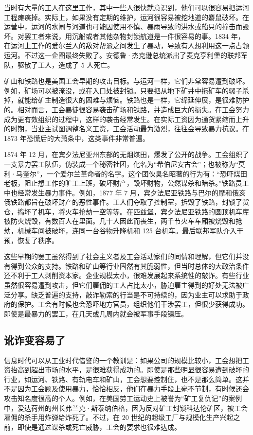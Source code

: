 当时有大量的工人在这里工作，其中一些人很快就意识到，他们可以很容易把运河工程瘫痪掉。实际上，如果没有定期的维护，运河很容易被挖地道的麝鼠破坏。在运营中，运河的水闸与河道也可能因使用不慎、暴雨导致的洪水或船只的撞击而毁坏。对罢工者来说，用沉船或者其他杂物封锁航道是一件很容易的事。1834 年，在运河上工作的爱尔兰人的敌对帮派之间发生了暴动，导致有人想利用这一点占领运河。不过这一企图最终失败了。安德鲁·杰克逊总统派出了麦克亨利堡的联邦军队，驱散了工人，造成了 5 人死亡。

矿山和铁路也是美国工会早期的攻击目标。与运河一样，它们非常容易遭到破坏。例如，矿场可以被淹没，或在入口处被封锁。只要把从地下矿井中拖矿车的骡子杀掉，就能给矿主制造很大的困难与烦恼。铁路也是一样，它绵延伸展，是很难防护的。相对而言，工会暴徒很容易袭击矿场和铁路，并造成巨大的损失。在工会努力成为更有效组织的过程中，这样的袭击经常发生。在实际工资因为通货紧缩而上升的时期，当业主试图调整名义工资，工会活动最为激烈，往往会导致暴力抗议。在 1873 年恐慌后的大萧条中，这类事件非常普遍。

1874 年 12 月，在宾夕法尼亚州东部的无烟煤田，爆发了公开的战争。工会组织了一支暴力罢工队伍，伪装成一个秘密社团，化名为“希伯尼安古会”；也被称为“莫利·马奎尔”，一个爱尔兰革命者的名字。这个团伙臭名昭著的行为有：“恐吓煤田老板，阻止想工作的旷工上班，破坏财产，毁坏财物，公然谋杀和暗杀。”铁路员工中也经常发生暴力事件。例如，1877 年 7 月，宾夕法尼亚铁路与巴尔的摩和俄亥俄铁路都旨在破坏财产的恶性事件。工人们夺取了控制室，拆毁了铁路，封锁了货仓，捣坏了机车，将火车抢劫一空等等。在匹兹堡，宾夕法尼亚铁路的圆顶机车库被防火烧毁，有数百人在里面。几十人因此而丧生，两千节火车车厢被烧毁和抢劫，机械车间被破坏，连同一台谷物升降机和 125 台机车。最后联邦军队介入干预，恢复了秩序。

这些早期的罢工虽然得到了社会主义者及工会活动家们的同情和理解，但它们并没有得到公众的支持。铁路和矿山等行业固然有其脆弱性，但当时总体的大政治条件还不利于工人剥削资本家。企业规模太小，很难发展起来系统性的敲诈。有些行业虽然很容易遭到攻击，但它们雇佣的工人占比太小，胁迫雇主得到的好处无法被广泛分享。缺乏普遍的支持，敲诈勒索的行当是不可持续的，因为业主可以求助于政府的保护。工会有时候也会恐吓地方官员，组织他们干涉罢工，但很少获得成功。即使是最暴力的罢工，在几天或几周内就会被军事手段镇压。

\subsection{讹诈变容易了}
信息时代可以从工业时代借鉴的一个教训是：如果公司的规模比较小，工会想把工资抬高到超出市场的水平，是很难获得成功的。即使是那些明显很容易遭到破坏的行业，如运河、铁路、有轨电车和矿山，工会想要控制住，也不是那么简单。这并不是因为工会顾及使用暴力，恰恰相反，他们在暴力手段上毫不节制，有时候还会攻击知名度很高的个人。例如，在美国劳工运动史上被誉为“矿工复仇记”的案例中，爱达荷州的州长弗兰克·斯泰纳伯格，因为反对矿工封锁科达伦矿区，被工会雇佣的杀手用炸弹给炸死了。不过，在 20 世纪的超级工厂与规模化生产兴起之前，即使是通过谋杀或死亡威胁，工会的要求也很难达成。

